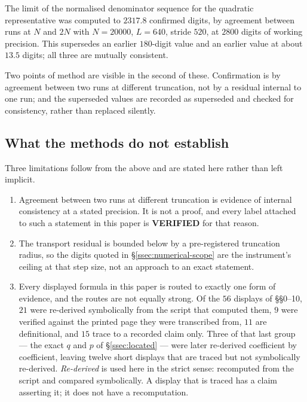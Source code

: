 \begin{remark}
The limit of the normalised denominator sequence for the quadratic
representative was computed to $2317.8$ confirmed digits, by agreement between
runs at $N$ and $2N$ with $N=20000$, $L=640$, stride $520$, at $2800$ digits of
working precision. This supersedes an earlier $180$-digit value and an earlier
value at about $13.5$ digits; all three are mutually consistent.
\end{remark}

Two points of method are visible in the second of these. Confirmation is by
agreement between two runs at different truncation, not by a residual
internal to one run; and the superseded values are recorded as superseded and
checked for consistency, rather than replaced silently.

\subsection{What the methods do not establish}\label{ssec:methods-limits}

Three limitations follow from the above and are stated here rather than left
implicit.

\begin{enumerate}
\item Agreement between two runs at different truncation is evidence of
  internal consistency at a stated precision. It is not a proof, and every
  label attached to such a statement in this paper is \textbf{VERIFIED} for
  that reason.
\item The transport residual is bounded below by a pre-registered truncation
  radius, so the digits quoted in \S\ref{ssec:numerical-scope} are the
  instrument's ceiling at that step size, not an approach to an exact
  statement.
\item Every displayed formula in this paper is routed to exactly one form of
  evidence, and the routes are not equally strong. Of the $56$ displays of
  \S\S0--10, $21$ were re-derived symbolically from the script that computed
  them, $9$ were verified against the printed page they were transcribed from,
  $11$ are definitional, and $15$ trace to a recorded claim only. Three of that
  last group --- the exact $q$ and $p$ of \S\ref{ssec:located} --- were later
  re-derived coefficient by coefficient, leaving twelve short displays that are
  traced but not symbolically re-derived. \emph{Re-derived} is used here in the
  strict sense: recomputed from the script and compared symbolically. A display
  that is traced has a claim asserting it; it does not have a recomputation.
\end{enumerate}
